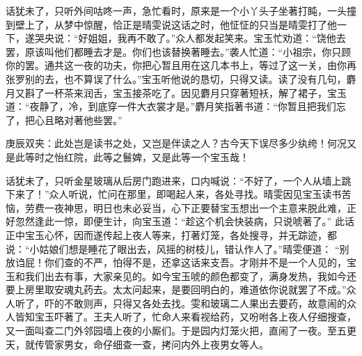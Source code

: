 \begin{parag}
    话犹未了，只听外间咕咚一声，急忙看时，原来是一个小丫头子坐著打盹，一头撞到壁上了，从梦中惊醒，恰正是晴雯说这话之时，他怔怔的只当是晴雯打了他一下，遂哭央说：“好姐姐，我再不敢了。”众人都发起笑来。宝玉忙劝道：“饶他去罢，原该叫他们都睡去才是。你们也该替换著睡去。”袭人忙道：“小祖宗，你只顾你的罢。通共这一夜的功夫，你把心暂且用在这几本书上，等过了这一关，由你再张罗别的去，也不算误了什么。”宝玉听他说的恳切，只得又读。读了没有几句，麝月又斟了一杯茶来润舌，宝玉接茶吃了。因见麝月只穿著短袄，解了裙子，宝玉道：“夜静了，冷，到底穿一件大衣裳才是。”麝月笑指著书道：“你暂且把我们忘了，把心且略对著他些罢。”\begin{note}庚辰双夹：此处岂是读书之处，又岂是伴读之人？古今天下误尽多少纨绔！何况又是此等时之怡红院，此等之鬟婢，又是此等一个宝玉哉！\end{note}
\end{parag}


\begin{parag}
    话犹未了，只听金星玻璃从后房门跑进来，口内喊说：“不好了，一个人从墙上跳下来了！”众人听说，忙问在那里，即喝起人来，各处寻找。晴雯因见宝玉读书苦恼，劳费一夜神思，明日也未必妥当，心下正要替宝玉想出一个主意来脱此难，正好忽然逢此一惊，即便生计，向宝玉道：“趁这个机会快装病，只说唬著了。” 此话正中宝玉心怀，因而遂传起上夜人等来，打著灯笼，各处搜寻，并无踪迹，都说：“小姑娘们想是睡花了眼出去，风摇的树枝儿，错认作人了。”晴雯便道： “别放诌屁！你们查的不严，怕得不是，还拿这话来支吾。才刚并不是一个人见的，宝玉和我们出去有事，大家亲见的。如今宝玉唬的颜色都变了，满身发热，我如今还要上房里取安魂丸药去。太太问起来，是要回明白的，难道依你说就罢了不成。”众人听了，吓的不敢则声，只得又各处去找。雯和玻璃二人果出去要药，故意闹的众人皆知宝玉吓著了。王夫人听了，忙命人来看视给药，又吩咐各上夜人仔细搜查，又一面叫查二门外邻园墙上夜的小厮们。于是园内灯笼火把，直闹了一夜。至五更天，就传管家男女，命仔细查一查，拷问内外上夜男女等人。
\end{parag}


